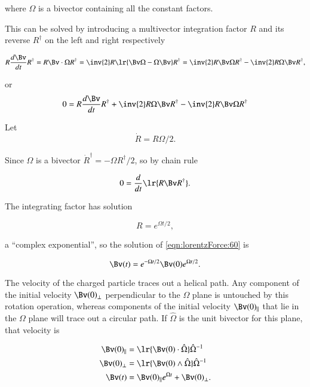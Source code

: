 where \( \Omega \) is a bivector containing all the constant factors.

This can be solved by introducing a multivector integration factor \( R \) and its reverse \( R^\dagger \) on the left and right respectively

\begin{dmath}\label{eqn:lorentzForce:100}
R \frac{d\Bv}{dt} R^\dagger
= R \Bv \cdot \Omega R^\dagger
= \inv{2} R \lr{ \Bv \Omega - \Omega \Bv} R^\dagger
= \inv{2} R \Bv \Omega R^\dagger - \inv{2} R \Omega \Bv R^\dagger,
\end{dmath}

or
\begin{dmath}\label{eqn:lorentzForce:120}
0 =
R \frac{d\Bv}{dt} R^\dagger
+ \inv{2} R \Omega \Bv R^\dagger
- \inv{2} R \Bv \Omega R^\dagger
\end{dmath}

Let
\begin{dmath}\label{eqn:lorentzForce:140}
\dot{R} = R \Omega/2.
\end{dmath}

Since \( \Omega \) is a bivector \( \dot{R}^\dagger = -\Omega R^\dagger/2 \), so by chain rule

\begin{dmath}\label{eqn:lorentzForce:160}
0
=
\frac{d}{dt} \lr{
R \Bv R^\dagger
}.
\end{dmath}

The integrating factor has solution

\begin{dmath}\label{eqn:lorentzForce:180}
R = e^{\Omega t/2},
\end{dmath}

a ``complex exponential'', so the solution of \cref{eqn:lorentzForce:60} is

\begin{dmath}\label{eqn:lorentzForce:200}
\Bv(t) = e^{-\Omega t/2} \Bv(0) e^{\Omega t/2}.
\end{dmath}

The velocity of the charged particle traces out a helical path.
Any component of the initial velocity \( \Bv(0)_\perp \) perpendicular to the \( \Omega \) plane is untouched by this rotation operation, whereas components of the initial velocity \( \Bv(0)_\parallel \) that lie in the \( \Omega \) plane will trace out a circular path.
If \( \hat{\Omega} \) is the unit bivector for this plane, that velocity is

\begin{dmath}\label{eqn:lorentzForce:220}
\begin{aligned}
\Bv(0)_\parallel &= \lr{ \Bv(0) \cdot \hat{\Omega} } \hat{\Omega}^{-1} \\
\Bv(0)_\perp &= \lr{ \Bv(0) \wedge \hat{\Omega} } \hat{\Omega}^{-1} \\
\Bv(t) &= \Bv(0)_\parallel e^{\Omega t} + \Bv(0)_\perp.
\end{aligned}
\end{dmath}

